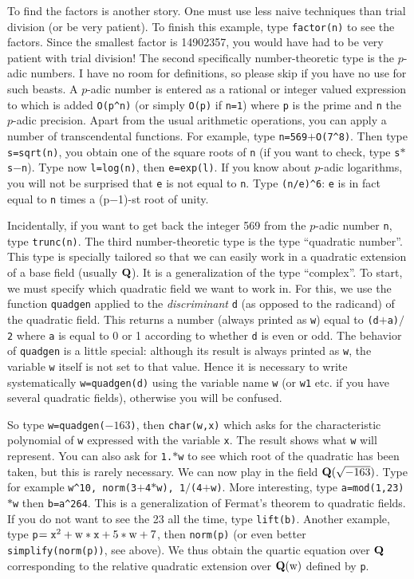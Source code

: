 To find the factors is another story. One must use less naive techniques than
trial division (or be very patient). To finish this example, type 
{\tt factor(n)} to see the factors. Since the smallest factor is 14902357,
you would have had to be very patient with trial division!
\smallskip
The second specifically number-theoretic type is the $p$-adic numbers. I have
no room for definitions, so please skip if you have no use for such beasts.
A $p$-adic number is entered as a rational or integer valued expression to which
is added {\tt O(p\^{}n)} (or simply {\tt O(p)} if {\tt n=1}) where {\tt p} is
the prime and {\tt n} the $p$-adic precision. Apart from the usual arithmetic
operations, you can apply a number of transcendental functions.
For example, type {\tt n=569$+$O(7\^{}8)}. Then type {\tt s=sqrt(n)}, you
obtain one of the square roots of {\tt n} (if you want to check, type 
{\tt s$*$s$-$n}). Type now {\tt l=log(n)}, then {\tt e=exp(l)}. If you
know about $p$-adic logarithms, you will not be surprised that {\tt e} is not
equal to {\tt n}. Type {\tt (n/e)\^{}6}: {\tt e} is in fact equal to {\tt n}
times a (p$-$1)-st root of unity.

Incidentally, if you want to get back the integer 569 from the $p$-adic number
{\tt n}, type {\tt trunc(n)}.
\smallskip
The third number-theoretic type is the type ``quadratic number''. This type
is specially tailored so that we can easily work in a quadratic extension
of a base field (usually $\Bbb Q$). It is a generalization of the type
``complex''. To start, we must specify which quadratic field we want to work
in. For this, we use the function {\tt quadgen} applied to the 
{\sl discriminant\/} {\tt d} (as opposed to the radicand) of the quadratic
field. This returns a number (always printed as {\tt w}) equal to
{\tt (d$+$a)$/$2} where {\tt a} is equal to 0 or 1 according to whether {\tt d}
is even or odd. The behavior of {\tt quadgen} is a little special: although
its result is always printed as {\tt w}, the variable {\tt w} itself is not
set to that value. Hence it is necessary to write systematically
{\tt w=quadgen(d)} using the variable name {\tt w} (or {\tt w1} etc. if you
have several quadratic fields), otherwise you will be confused.

So type {\tt w=quadgen($-163$)}, then {\tt char(w,x)} which asks for the
characteristic polynomial of {\tt w} expressed with the variable {\tt x}.
The result shows what {\tt w} will represent. You can also ask for {\tt 1.$*$w}
to see which root of the quadratic has been taken, but this is rarely 
necessary. We can now play in the field $\Bbb Q(\sqrt{-163})$. Type for example
{\tt w\^{}10, norm(3$+$4$*$w), 1$/$(4$+$w)}. More interesting, type
{\tt a=mod(1,23)$*$w} then {\tt b=a\^{}264}. This is a generalization of Fermat's
theorem to quadratic fields. If you do not want to see the 23 all the time,
\def\x{{\tt x}}
type {\tt lift(b)}. Another example, type 
{\tt p$=\x^2+\text{w}*\x+5*\text{w}+7$}, then {\tt norm(p)} (or even
better {\tt simplify(norm(p))}, see above). We thus
obtain the quartic equation over $\Q$ corresponding to the relative quadratic
extension over $\Q(\text{w})$ defined by {\tt p}.


